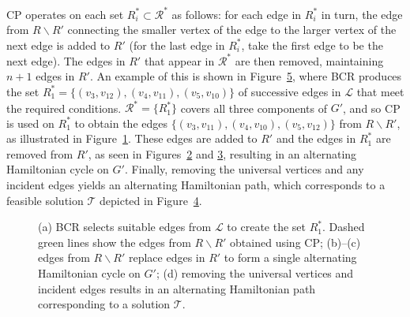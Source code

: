 \documentclass[authoryear]{elsarticle}
\begin{document}
CP operates on each set $R^*_i \subset \mathcal{R}^*$ as follows: for each edge in $R^*_i$ in turn, the edge from $R \backslash R'$ connecting the smaller vertex of the edge to the larger vertex of the next edge is added to $R'$ (for the last edge in $R^*_i$, take the first edge to be the next edge). The edges in $R'$ that appear in $\mathcal{R}^*$ are then removed, maintaining $n+1$ edges in $R'$. An example of this is shown in Figure~\ref{fig:bcr}, where BCR produces the set $R^*_1 = \{(v_3, v_{12}),(v_4, v_{11}), (v_5, v_{10})\}$ of successive edges in $\mathcal{L}$ that meet the required conditions. $\mathcal{R}^* =\{R^*_1\}$ covers all three components of $G'$, and so CP is used on $R^*_1$ to obtain the edges $\{(v_3,v_{11}),(v_4, v_{10}),(v_5, v_{12})\}$ from $R\backslash R'$, as illustrated in Figure~\ref{fig:bcrandcp}. These edges are added to $R'$ and the edges in $R^*_1$ are removed from $R'$, as seen in Figures~\ref{fig:mpsconnect} and \ref{fig:mpscycle}, resulting in an alternating Hamiltonian cycle on $G'$. Finally, removing the universal vertices and any incident edges yields an alternating Hamiltonian path, which corresponds to a feasible solution $\mathcal{T}$ depicted in Figure~\ref{fig:solutionpath}.

\begin{figure}[H]	
	\centering
	\begin{subfigure}[h]{0.35\textwidth}
		
		\caption{}
		\label{fig:bcrandcp}
	\end{subfigure} \hspace{7mm} %
	\begin{subfigure}[h]{0.25\textwidth}
		
		\caption{}
		\label{fig:mpsconnect}
	\end{subfigure} \hspace{7mm} %
	\begin{subfigure}[h]{0.25\textwidth}
		
		\caption{}
		\label{fig:mpscycle}
	\end{subfigure}
	\begin{subfigure}[h]{0.55\textwidth}
		
		\caption{}
		\label{fig:solutionpath}
	\end{subfigure}
	\caption{(a) BCR selects suitable edges from $\mathcal{L}$ to create the set $R^*_1$. Dashed green lines show the edges from $R\backslash R'$ obtained using CP; (b)--(c) edges from $R\backslash R'$ replace edges in $R'$ to form a single alternating Hamiltonian cycle on $G'$; (d) removing the universal vertices and incident edges results in an alternating Hamiltonian path corresponding to a solution $\mathcal{T}$.}
	\label{fig:bcr}
\end{figure}
\end{document}
